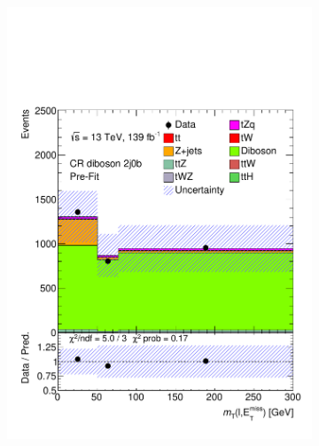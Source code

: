 \begin{figure}[!h]
\begin{subfigure}[b]{0.33\linewidth}
    \includegraphics[width=\textwidth]{ubonn-thesis/Chapters/Chapters_08/appendix/data/CR_2j0b.pdf} 
  \end{subfigure}%
  \begin{subfigure}[b]{0.33\linewidth}
    \centering

\end{subfigure}
\end{figure}
